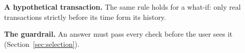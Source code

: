 

\textbf{A hypothetical transaction.} The same rule holds for a what-if: only real transactions strictly before its time
form its history.



\noindent\begin{minipage}{\linewidth}
\textbf{The guardrail.} An answer must pass every check before the user sees it (Section~\ref{sec:selection}).


\end{minipage}
